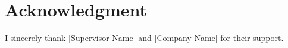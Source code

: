 \chapter*{Acknowledgment}
I sincerely thank [Supervisor Name] and [Company Name] for their support.
